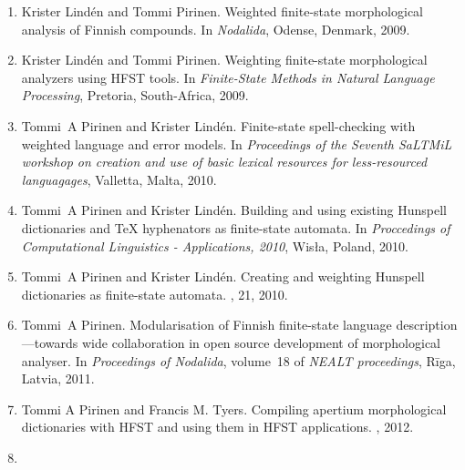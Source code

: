\documentclass[officiallayout,draft]{unihelcompling}
\begin{document}
\begin{enumerate}
    \item[\citetalias{pirinen2009weighted}]
        Krister Lindén and Tommi Pirinen.
        \newblock Weighted finite-state morphological analysis of Finnish 
        compounds.
        \newblock In \emph{Nodalida}, Odense, Denmark, 2009.
    \item[\citetalias{pirinen2009weighting}]
        Krister Lindén and Tommi Pirinen.
        \newblock Weighting finite-state morphological analyzers using HFST
        tools.
        \newblock In \emph{Finite-State Methods in Natural Language Processing},
        Pretoria, South-Africa, 2009.
    \item[\citetalias{pirinen2010finitestate}]
        Tommi~A Pirinen and Krister Lindén.
        \newblock Finite-state spell-checking with weighted language and error
        models.
        \newblock In {\em Proceedings of the Seventh SaLTMiL workshop on 
            creation and use of basic lexical resources for less-resourced 
        languagages}, Valletta, Malta, 2010.
    \item[\citetalias{pirinen2010building}]
        Tommi~A Pirinen and Krister Lindén.
        \newblock Building and using existing Hunspell dictionaries and {\TeX }
        hyphenators as finite-state automata.
        \newblock In {\em Proccedings of Computational Linguistics -
            Applications, 2010}, Wis{\l}a, Poland, 2010.
    \item[\citetalias{pirinen2010creating}]
        Tommi~A Pirinen and Krister Lindén.
        \newblock Creating and weighting Hunspell dictionaries as finite-state
        automata.
        , 21, 2010.
    \item[\citetalias{pirinen2011modularisation}]
        Tommi~A Pirinen.
        \newblock Modularisation of Finnish finite-state language 
        description—towards wide collaboration in open source development of
        morphological analyser.
        \newblock In {\em Proceedings of Nodalida}, volume~18 of {\em NEALT
        proceedings}, Rīga, Latvia, 2011.
    \item[\citetalias{pirinen2012compiling}]
        Tommi A Pirinen and Francis M. Tyers.
        \newblock Compiling apertium morphological dictionaries with HFST and
        using them in HFST applications.
        , 2012.
    \item[\citetalias{pirinen2012effects}]

\end{enumerate}
\end{document}
